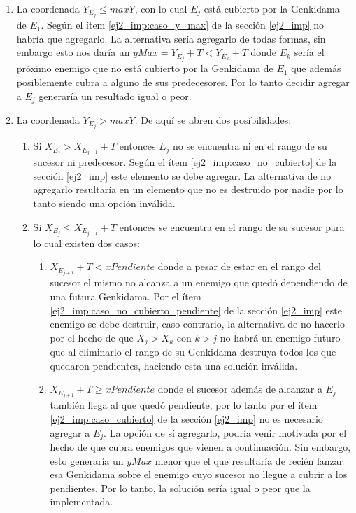 \begin{enumerate}
{			\begin{enumerate}
				\item{
					La coordenada $Y_{E_j} \leq maxY$, con lo cual $E_j$ está
					cubierto por la Genkidama de $E_1$. Según el ítem
					\ref{ej2_imp:caso_y_max} de la sección \ref{ej2_imp} no
					habría que agregarlo. La alternativa sería agregarlo de
					todas formas, sin embargo esto nos daría un $yMax = Y_{E_j}
					+ T < Y_{E_k} + T$ donde $E_k$ sería el próximo enemigo
					que no está cubierto por la Genkidama de $E_1$ que además
					posiblemente cubra a alguno de sus predecesores. Por lo
					tanto decidir agregar a $E_j$ generaría un resultado igual o
					peor.
				}
				\item{
					La coordenada $Y_{E_j} > maxY$. De aquí se abren dos
					posibilidades:
					\begin{enumerate}
						\item{
							Si $X_{E_j} > X_{E_{j+1}} + T$ entonces $E_j$ no se
							encuentra ni en el rango de su sucesor ni
							predecesor. Según el ítem
							\ref{ej2_imp:caso_no_cubierto} de la sección
							\ref{ej2_imp} este elemento se debe agregar. La
							alternativa de no agregarlo resultaría en un
							elemento que no es destruido por nadie por lo tanto
							siendo una opción inválida.
						}
						\item{
							Si $X_{E_j} \leq X_{E_{j+1}} + T$ entonces se
							encuentra en el rango de su sucesor para lo cual
							existen dos casos:
							\begin{enumerate}
								\item{
									$X_{E_{j+1}} + T < xPendiente$ donde a pesar
									de estar en el rango del sucesor el mismo no
									alcanza a un enemigo que quedó dependiendo
									de una futura Genkidama. Por el ítem
									\ref{ej2_imp:caso_no_cubierto_pendiente} de
									la sección \ref{ej2_imp} este enemigo se
									debe destruir, caso contrario, la
									alternativa de no hacerlo por el hecho de
									que $X_j > X_k$ con $k > j$ no habrá un
									enemigo futuro que al eliminarlo el rango de
									su Genkidama destruya todos los que quedaron
									pendientes, haciendo esta una solución
									inválida.
								}
								\item{
									$X_{E_{j+1}} + T \geq xPendiente$ donde el
									sucesor además de alcanzar a $E_j$ también
									llega al que quedó pendiente, por lo tanto
									por el ítem \ref{ej2_imp:caso_cubierto} de
									la sección \ref{ej2_imp} no es necesario
									agregar a $E_j$. La opción de sí agregarlo,
									podría venir motivada por el hecho de que
									cubra enemigos que vienen a continuación.
									Sin embargo, esto generaría un $yMax$ menor
									que el que resultaría de recién lanzar esa
									Genkidama sobre el enemigo cuyo sucesor no llegue a
									cubrir a los pendientes. Por lo tanto, la
									solución sería igual o peor que la
									implementada.
								}
							\end{enumerate}
						}
					\end{enumerate}
				}
			\end{enumerate}

}
\end{enumerate}
